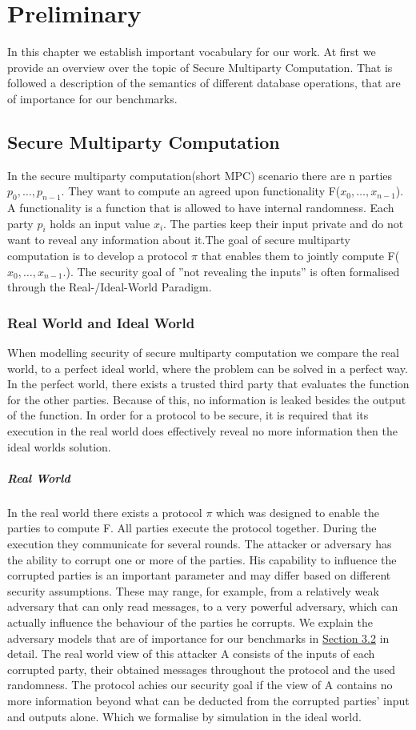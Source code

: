 \label{Preliminary}	
\chapter{Preliminary}
In this chapter we establish important vocabulary for our work. At first we provide an overview over the topic of Secure Multiparty Computation. That is followed a description of the semantics of different database operations, that are of importance for our benchmarks.  
\section{Secure Multiparty Computation}
In the secure multiparty computation(short MPC) scenario there are n parties 
$ p_0,\dots,p_{n-1} $. They want to compute an agreed upon functionality F($ x_0,\dots,x_{n-1} $). A functionality is a function that is allowed to have internal randomness. 
Each party $ p_i $ holds an input value $ x_i $. 
The parties keep their input private and do not want to reveal any information about it.The goal of secure multiparty computation is to develop a protocol  $ \pi $ that enables them to jointly compute F($ x_0,\dots,x_{n-1}. $). The security goal of ''not revealing the inputs'' is often formalised through the Real-/Ideal-World Paradigm. 


\subsection{Real World and Ideal World}
When modelling security of secure multiparty computation we compare the real world, to a perfect ideal world, where the problem can be solved in a perfect way. In the perfect world, there exists a trusted third party that evaluates the function for the other parties. Because of this, no information is leaked besides the output of the function. In order for a protocol to be secure, it is required that its execution in the real world does effectively reveal no more information then the ideal worlds solution.   
\paragraph{Real World}
In the real world there exists a protocol $\pi $ which was designed to enable the parties to compute F. All parties execute the protocol together. During the execution they communicate for several rounds. The attacker or adversary has the ability to corrupt one or more of the parties. His capability to influence the corrupted parties is an important parameter and may differ based on different security assumptions. These may range, for example, from a relatively weak adversary that can only read messages, to a very powerful adversary, which can actually influence the behaviour of the parties he corrupts. We explain the adversary models that are of importance for our benchmarks in \hyperref[sec:Adversarial Models]{Section 3.2} in detail.
The real world view of this attacker A consists of the inputs of each corrupted party, their obtained messages throughout the protocol and the used randomness. The protocol achies our security goal if the view of A contains no more information beyond what can be deducted from the corrupted parties' input and outputs alone. Which we formalise by simulation in the ideal world. 
